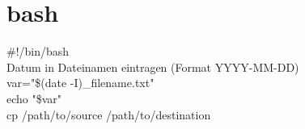 \newpage
\chapter{bash}

\#!/bin/bash\\

Datum in Dateinamen eintragen (Format YYYY-MM-DD)\\
var="\$(date -I)\_filename.txt"\\
echo "\${var}"\\
cp /path/to/source /path/to/destination\\